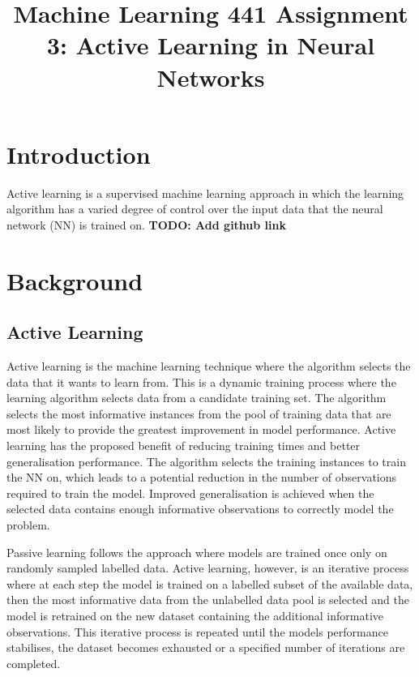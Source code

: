 \documentclass[conference]{IEEEtran}
\begin{document}
	
	\title{Machine Learning 441 Assignment 3: Active Learning in Neural Networks}
	\author{
	}
	\maketitle
	
	\begin{abstract}
	
	\end{abstract}
	
	\section{Introduction}
	Active learning is a supervised machine learning approach in which the learning algorithm has a varied degree of control over the input data that the neural network (NN) is trained on. 
	\textbf{TODO: Add github link}

	\section{Background}\label{B}
	\subsection{Active Learning}
	Active learning is the machine learning technique where the algorithm selects the data that it wants to learn from. This is a dynamic training process where the learning algorithm selects data from a candidate training set. The algorithm selects the most informative instances from the pool of training data that are most likely to provide the greatest improvement in model performance. Active learning has the proposed benefit of reducing training times and better generalisation performance. The algorithm selects the training instances to train the NN on, which leads to a potential reduction in the number of observations required to train the model. Improved generalisation is achieved when the selected data contains enough informative observations to correctly model the problem.
	
	Passive learning follows the approach where models are trained once only on randomly sampled labelled data. Active learning, however, is an iterative process where at each step the model is trained on a labelled subset of the available data, then the most informative data from the unlabelled data pool is selected and the model is retrained on the new dataset containing the additional informative observations. This iterative process is repeated until the models performance stabilises, the dataset becomes exhausted or a specified number of iterations are completed.
	
\end{document}
